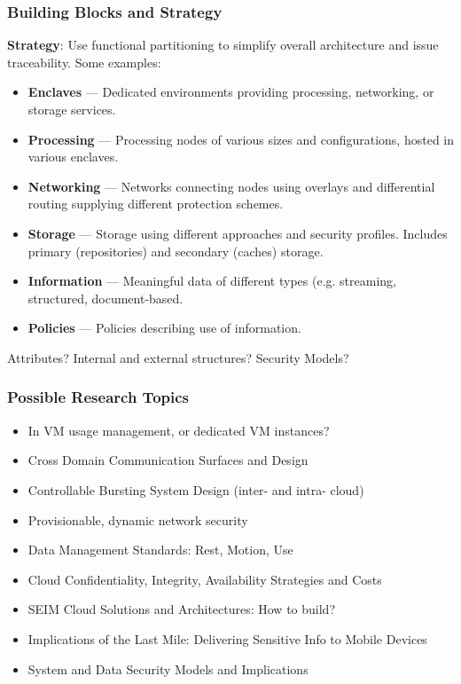 \documentclass[t,handout]{beamer}
\begin{document}
\begin{frame}
\frametitle{Building Blocks and Strategy}
{\bf Strategy}: Use functional partitioning to simplify overall architecture and issue traceability. Some examples:
\begin{itemize}
\item {\small {\bf Enclaves} --- Dedicated environments providing processing, networking, or storage services.}
\item {\small {\bf Processing} --- Processing nodes of various sizes and configurations, hosted in various enclaves.}
\item {\small {\bf Networking} --- Networks connecting nodes using overlays and differential routing supplying different protection schemes.}
\item {\small {\bf Storage} --- Storage using different approaches and security profiles.  Includes primary (repositories) and secondary (caches) storage.}
\item {\small {\bf Information} --- Meaningful data of different types (e.g. streaming, structured, document-based.}
\item {\small {\bf Policies} --- Policies describing use of information.}
\end{itemize}
Attributes? Internal and external structures? Security Models?
\end{frame}

\begin{frame}
\frametitle{Possible Research Topics}
\begin{itemize}
\item In VM usage management, or dedicated VM instances?
\item Cross Domain Communication Surfaces and Design
\item Controllable Bursting System Design  (inter- and intra- cloud)
\item Provisionable, dynamic network security
\item Data Management Standards: Rest, Motion, Use
\item Cloud Confidentiality, Integrity, Availability Strategies and Costs
\item SEIM Cloud Solutions and Architectures: How to build?
\item Implications of the Last Mile: Delivering Sensitive Info to Mobile Devices
\item System and Data Security Models and Implications
\end{itemize}
\end{frame}
\end{document}
